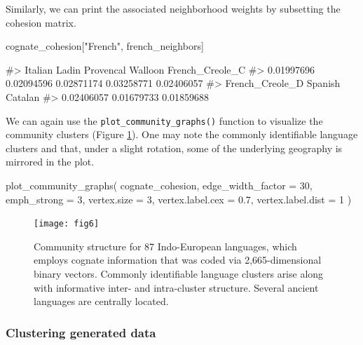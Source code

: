 Similarly, we can print the associated neighborhood weights by
subsetting the cohesion matrix.

\begin{Schunk}
\begin{Sinput}
cognate_cohesion["French", french_neighbors]
\end{Sinput}
\begin{Soutput}
#>         Italian           Ladin       Provencal         Walloon French_Creole_C 
#>      0.01997696      0.02094596      0.02871174      0.03258771      0.02406057 
#> French_Creole_D         Spanish         Catalan 
#>      0.02406057      0.01679733      0.01859688
\end{Soutput}
\end{Schunk}

We can again use the \texttt{plot\_community\_graphs()} function to
visualize the community clusters (Figure \ref{fig:figlang}). One may
note the commonly identifiable language clusters and that, under a
slight rotation, some of the underlying geography is mirrored in the
plot.

\begin{Schunk}
\begin{Sinput}
plot_community_graphs(
  cognate_cohesion,
  edge_width_factor = 30,
  emph_strong = 3,
  vertex.size = 3,
  vertex.label.cex = 0.7,
  vertex.label.dist = 1
)
\end{Sinput}
\end{Schunk}

\begin{Schunk}
\begin{figure}
\texttt{[image: fig6]} \caption[Community structure for 87 Indo-European languages, which employs cognate information that was coded via 2,665-dimensional binary vectors]{Community structure for 87 Indo-European languages, which employs cognate information that was coded via 2,665-dimensional binary vectors. Commonly identifiable language clusters arise along with informative inter- and intra-cluster structure. Several ancient languages are centrally located.}\label{fig:figlang}
\end{figure}
\end{Schunk}

\hypertarget{clustering-generated-data}{%
\subsubsection{Clustering generated
data}\label{clustering-generated-data}}

